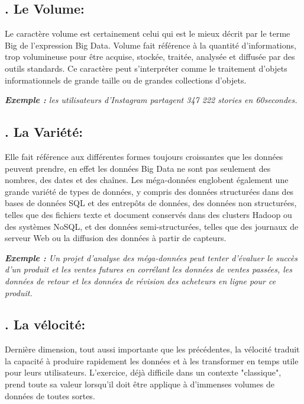 \subsection*{. Le Volume:}
Le caractère volume est certainement celui qui est le mieux décrit par le terme Big de l'expression Big Data. Volume fait référence à la quantité d'informations, trop volumineuse pour être acquise, stockée, traitée, analysée et diffusée par des outils standards. Ce caractère peut s'interpréter comme le traitement d'objets informationnels de grande taille ou de grandes collections d'objets.

\textit{\textbf{Exemple :} les utilisateurs d'Instagram partagent 347 222 stories en 60secondes.}

\subsection*{. La Variété:}
Elle fait référence aux différentes formes toujours croissantes que les données peuvent prendre, en effet les données Big Data ne sont pas seulement des nombres, des dates et des chaînes. Les méga-données englobent également une grande variété de types de données, y compris des données structurées dans des bases de données SQL et des entrepôts de données, des données non structurées, telles que des fichiers texte et document conservés dans des clusters Hadoop ou des systèmes NoSQL, et des données semi-structurées, telles que des journaux de serveur Web ou la diffusion des données à partir de capteurs.

\textit{\textbf{Exemple :} Un projet d'analyse des méga-données peut tenter d'évaluer le succès d'un produit et les ventes futures en corrélant les données de ventes passées, les données de retour et les données de révision des acheteurs en ligne pour ce produit.}

\subsection*{. La vélocité:}
Dernière dimension, tout aussi importante que les précédentes, la vélocité traduit la capacité à produire rapidement les données et à les transformer en temps utile pour leurs utilisateurs. L'exercice, déjà difficile dans un contexte "classique", prend toute sa valeur lorsqu'il doit être applique à d'immenses volumes de données de toutes sortes.


